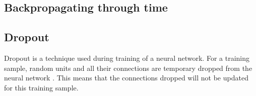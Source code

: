 \subsection{Backpropagating through time}

\subsection{Dropout}
\label{dead-neurons}
% 

Dropout is a technique used during training of a neural network. For a training sample, random units and all their connections are temporary dropped from the neural network \parencite{srivastava_dropout:_2014}. This means that the connections dropped will not be updated for this training sample. 


